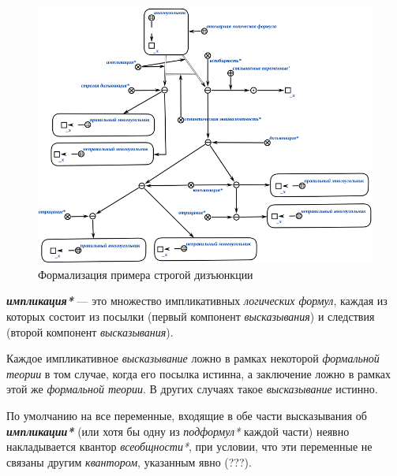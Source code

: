 \begin{figure}[http]
	\includegraphics[scale=0.8]{author/part2/figures/logic/strict_disjunction_representation.png}
	\caption{Формализация примера строгой дизъюнкции}
	\label{fig:strict_disjunction_representation}
\end{figure}

\begin{SCn}
\end{SCn}

\textbf{\textit{импликация*}} --- это множество импликативных \textit{логических формул}, каждая из которых состоит из посылки (первый компонент \textit{высказывания}) и следствия (второй компонент \textit{высказывания}).

Каждое импликативное \textit{высказывание} ложно в рамках некоторой \textit{формальной теории} в том случае, когда его посылка истинна, а заключение ложно в рамках этой же \textit{формальной теории}. В других случаях такое \textit{высказывание} истинно.

По умолчанию на все переменные, входящие в обе части высказывания об \textbf{\textit{импликации*}} (или хотя бы одну из \textit{подформул*} каждой части) неявно накладывается квантор \textit{всеобщности*}, при условии, что эти переменные не связаны другим \textit{квантором}, указанным явно (???).

